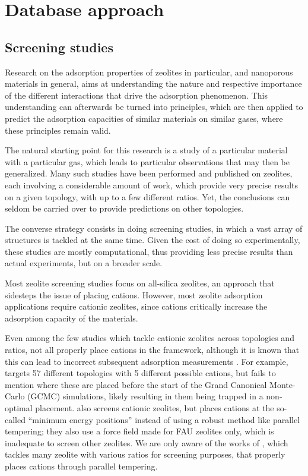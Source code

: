 \documentclass[main.tex]{subfiles}
\begin{document}
\chapter{Database approach}
\vspace*{-1\baselineskip}

\section{Screening studies}

Research on the adsorption properties of zeolites in particular, and nanoporous materials in general, aims at understanding the nature and respective importance of the different interactions that drive the adsorption phenomenon. This understanding can afterwards be turned into principles, which are then applied to predict the adsorption capacities of similar materials on similar gases, where these principles remain valid.

The natural starting point for this research is a study of a particular material with a particular gas, which leads to particular observations that may then be generalized. Many such studies have been performed and published on zeolites, each involving a considerable amount of work, which provide very precise results on a given topology, with up to a few different \SiAl ratios. Yet, the conclusions can seldom be carried over to provide predictions on other topologies.

The converse strategy consists in doing screening studies, in which a vast array of structures is tackled at the same time. Given the cost of doing so experimentally, these studies are mostly computational, thus providing less precise results than actual experiments, but on a broader scale.

Most zeolite screening studies focus on all-silica zeolites, an approach that sidesteps the issue of placing cations. However, most zeolite adsorption applications require cationic zeolites, since cations critically increase the adsorption capacity of the materials.

Even among the few studies which tackle cationic zeolites across topologies and \SiAl ratios, not all properly place cations in the framework, although it is known that this can lead to incorrect subsequent adsorption measurements \autocite{Fang2016}. For example, \cite{Mousavi2023} targets 57 different topologies with 5 different possible cations, but fails to mention where these are placed before the start of the Grand Canonical Monte-Carlo (GCMC) simulations, likely resulting in them being trapped in a non-optimal placement. \Cite{SmitNature2012} also screens cationic zeolites, but places cations at the so-called ``minimum energy positions'' instead of using a robust method like parallel tempering; they also use a force field made for FAU zeolites only, which is inadequate to screen other zeolites.
We are only aware of the works of \cite{Fang2016}, which tackles many zeolite with various \SiAl ratios for screening purposes, that properly places cations through parallel tempering.
\end{document}
